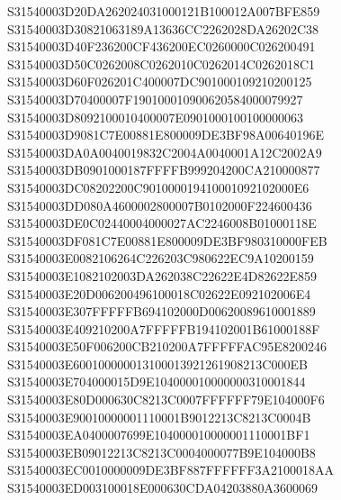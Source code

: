 \documentclass[12pt,a4paper]{article}
\begin{document}
\begin{framed}
{S31540003D20DA262024031000121B100012A007BFE859\newline
S31540003D30821063189A13636CC2262028DA26202C38\newline
S31540003D40F236200CF436200EC0260000C026200491\newline
S31540003D50C0262008C0262010C0262014C0262018C1\newline
S31540003D60F026201C400007DC901000109210200125\newline
S31540003D70400007F190100010900620584000079927\newline
S31540003D8092100010400007E0901000100100000063\newline
S31540003D9081C7E00881E800009DE3BF98A00640196E\newline
S31540003DA0A0040019832C2004A0040001A12C2002A9\newline
S31540003DB0901000187FFFFB999204200CA210000877\newline
S31540003DC08202200C901000019410001092102000E6\newline
S31540003DD080A4600002800007B0102000F224600436\newline
S31540003DE0C02440004000027AC2246008B01000118E\newline
S31540003DF081C7E00881E800009DE3BF980310000FEB\newline
S31540003E0082106264C226203C980622EC9A10200159\newline
S31540003E1082102003DA262038C22622E4D82622E859\newline
S31540003E20D006200496100018C02622E092102006E4\newline
S31540003E307FFFFFB694102000D00620089610001889\newline
S31540003E409210200A7FFFFFB194102001B61000188F\newline
S31540003E50F006200CB210200A7FFFFFAC95E8200246\newline
S31540003E600100000013100013921261908213C000EB\newline
S31540003E704000015D9E104000010000000310001844\newline
S31540003E80D000630C8213C0007FFFFFF79E104000F6\newline
S31540003E90010000001110001B9012213C8213C0004B\newline
S31540003EA0400007699E104000010000001110001BF1\newline
S31540003EB09012213C8213C0004000077B9E104000B8\newline
S31540003EC0010000009DE3BF887FFFFFF3A2100018AA\newline
S31540003ED003100018E000630CDA04203880A3600069\newline
}
\end{framed}
\end{document}
